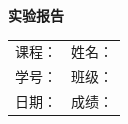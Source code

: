 \documentclass[zihao=-4]{ctexart}
\newcommand{\reportTitle}{实验报告}
\newcommand{\reportCourse}{}
\newcommand{\reportName}{}
\newcommand{\reportID}{}
\newcommand{\reportClass}{}
\newcommand{\reportDate}{}
\begin{document}
\begin{center}
  {\bfseries \reportTitle\par}
  \vspace{5mm}
  {
  \begin{tabular}{@{}p{}p{}@{}}
    课程：\reportCourse & 姓名：\reportName\\[2mm]
    学号：\reportID & 班级：\reportClass\\[2mm]
    日期：\reportDate & 成绩：\\
  \end{tabular}}
\end{center}
\vspace{5mm}
\end{document}
